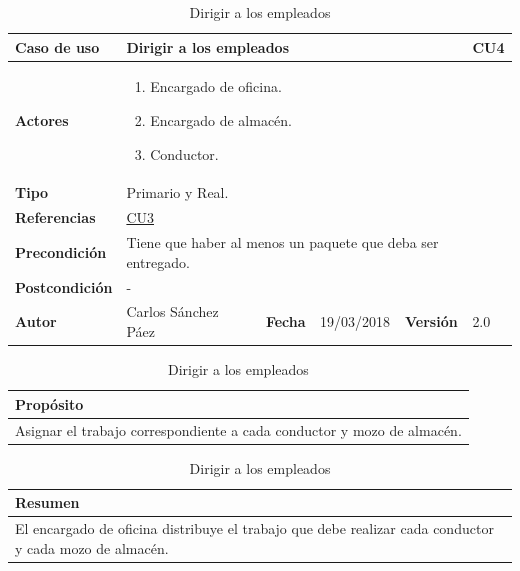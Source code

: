 \documentclass[12pt,spanish]{article}
\begin{document}
\begin{table}[H]
\centering
\begin{tabular}{|m{3cm}|m{4cm}|m{2cm}|m{2cm}|m{2cm}|m{1cm}|}
\hline
\textbf{Caso de uso} &  \multicolumn{4}{m{8cm}|}{Dirigir a los empleados} \vline &  \cellcolor{gray!40}CU4 \\
\hline
\textbf{Actores} & \multicolumn{5}{m{8cm}|}{\begin{enumerate}
\item Encargado de oficina.
\item Encargado de almacén.
\item Conductor.
\end{enumerate}} \\
\hline
\textbf{Tipo} & \multicolumn{5}{m{8cm}|}{Primario y Real.} \\
\hline
\textbf{Referencias} &\multicolumn{5}{m{8cm}|}{\hyperref[cu:3]{CU3}} \\
\hline
\textbf{Precondición} & \multicolumn{5}{m{8cm}|}{Tiene que haber al menos un paquete que deba ser entregado.} \\
\hline
\textbf{Postcondición} & \multicolumn{5}{m{8cm}|}{-} \\
\hline
\textbf{Autor} & Carlos Sánchez Páez & \textbf{Fecha} & 19/03/2018 & \textbf{Versión} & 2.0 \\
\hline
\end{tabular}

\vspace{1cm}

\begin{tabular}{|m{16.2cm}|}
\hline
\textbf{Propósito} \\
\hline
Asignar el trabajo correspondiente a cada conductor y mozo de almacén. \\
\hline
\end{tabular}

\vspace{1cm}

\begin{tabular}{|m{16.2cm}|}
\hline
\textbf{Resumen} \\
\hline
El encargado de oficina distribuye el trabajo que debe realizar cada conductor y cada mozo de almacén. \\
\hline
\end{tabular}

\caption{Dirigir a los empleados}
\label{cu:4}
\end{table}

\end{document}
